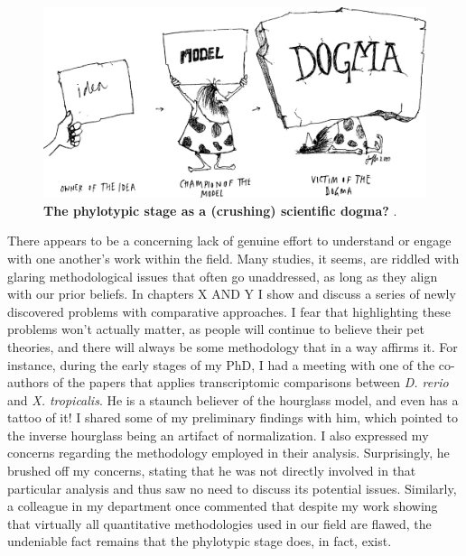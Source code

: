 \begin{figure}
    \includegraphics[width=\linewidth]{ch.discussion/imgs/dogma.png}
    \caption{\textbf{The phylotypic stage as a (crushing) scientific dogma?} \cite{Caveman2000}.}
    \label{fig:dogma}
\end{figure}

There appears to be a concerning lack of genuine effort to understand or engage with one another's work within the field. Many studies, it seems, are riddled with glaring methodological issues that often go unaddressed, as long as they align with our prior beliefs. In chapters X AND Y I show and discuss a series of newly discovered problems with comparative approaches. I fear that highlighting these problems won't actually matter, as people will continue to believe their pet theories, and there will always be some methodology that in a way affirms it. For instance, during the early stages of my PhD, I had a meeting with one of the co-authors of the papers that applies transcriptomic comparisons between \textit{D. rerio} and \textit{X. tropicalis}\cite{marletaz2018}. He is a staunch believer of the hourglass model, and even has a tattoo of it! I shared some of my preliminary findings with him, which pointed to the inverse hourglass being an artifact of normalization. I also expressed my concerns regarding the methodology employed in their analysis. Surprisingly, he brushed off my concerns, stating that he was not directly involved in that particular analysis and thus saw no need to discuss its potential issues. Similarly, a colleague in my department once commented that despite my work showing that virtually all quantitative methodologies used in our field are flawed, the undeniable fact remains that the phylotypic stage does, in fact, exist.

